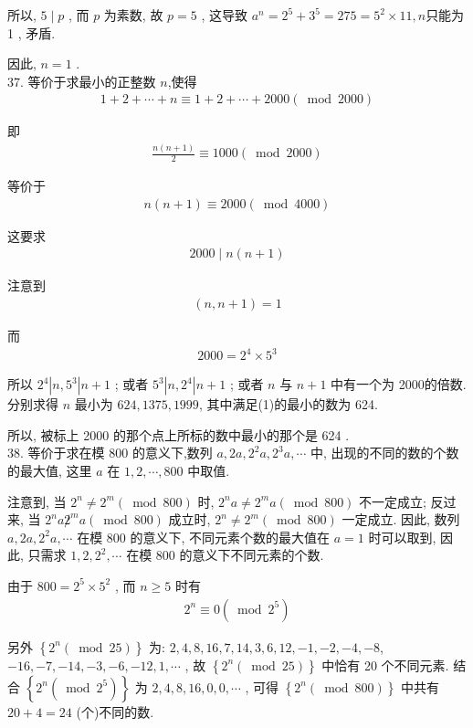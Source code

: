 所以,  $5 \mid p$ , 而 $p$ 为素数, 故 $p=5$ , 这导致 $a^{n}=2^{5}+3^{5}=275=5^{2} \times 11 ,  n$只能为 1 , 矛盾.

因此,  $n=1$ . \\
37. 等价于求最小的正整数 $n$,使得
\begin{align*}
	1+2+\cdots+n \equiv 1+2+\cdots+2000(\bmod 2000)
\end{align*}

即
\begin{align*}
	\frac{n(n+1)}{2} \equiv 1000(\bmod 2000)
\end{align*}

等价于
\begin{align*}
	n(n+1) \equiv 2000(\bmod 4000)
\end{align*}

这要求
\begin{align*}
	2000 \mid n(n+1)
\end{align*}

注意到
\begin{align*}
	(n, n+1)=1
\end{align*}

而
\begin{align*}
	2000=2^{4} \times 5^{3}
\end{align*}

所以 $2^{4}\left|n ,  5^{3}\right| n+1$ ; 或者 $5^{3}\left|n ,  2^{4}\right| n+1$ ; 或者 $n$ 与 $n+1$ 中有一个为 2000的倍数. 分别求得 $n$ 最小为 $624,1375,1999$, 其中满足(1)的最小的数为 624.

所以, 被标上 2000 的那个点上所标的数中最小的那个是 624 .\\
38. 等价于求在模 800 的意义下,数列 $a, 2 a, 2^{2} a, 2^{3} a, \cdots$ 中, 出现的不同的数的个数的最大值, 这里 $a$ 在 $1,2, \cdots, 800$ 中取值.

注意到, 当 $2^{n} \neq 2^{m}(\bmod 800)$ 时,  $2^{n} a \neq 2^{m} a(\bmod 800)$ 不一定成立; 反过来, 当 $2^{n} a \not 2^{m} a(\bmod 800)$ 成立时,  $2^{n} \neq 2^{m}(\bmod 800)$ 一定成立. 因此, 数列 $a, 2 a, 2^{2} a, \cdots$ 在模 800 的意义下, 不同元素个数的最大值在 $a=1$ 时可以取到, 因此, 只需求 $1,2,2^{2}, \cdots$ 在模 800 的意义下不同元素的个数.

由于 $800=2^{5} \times 5^{2}$ , 而 $n \geqslant 5$ 时有
\begin{align*}
	2^{n} \equiv 0\left(\bmod 2^{5}\right)
\end{align*}

另外 $\left\{2^{n}(\bmod 25)\right\}$ 为: $2,4,8,16,7,14,3,6,12,-1,-2,-4,-8$, $-16,-7,-14,-3,-6,-12,1, \cdots$ , 故 $\left\{2^{n}(\bmod 25)\right\}$ 中恰有 20 个不同元素. 结合 $\left\{2^{n}\left(\bmod 2^{5}\right)\right\}$ 为 $2,4,8,16,0,0, \cdots$ , 可得 $\left\{2^{n}(\bmod 800)\right\}$ 中共有 $20+4=24$ (个)不同的数.

